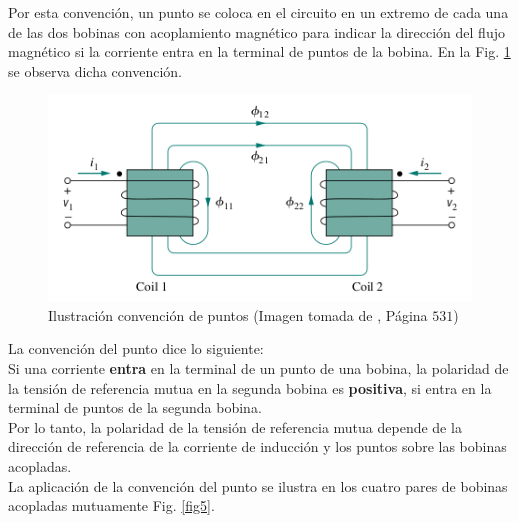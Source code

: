 \documentclass[twocolumn]{IEEEtran}
\begin{document}
Por esta convención, un punto se coloca en el circuito en un extremo de cada una de las dos bobinas con acoplamiento magnético para indicar la dirección del flujo magnético si la corriente entra en la terminal de puntos de la bobina. En la Fig. \ref{fig4} se observa dicha convención.
\begin{figure}[H]
	\centering
		\includegraphics[scale=0.6]{point.png}
	\caption{Ilustración convención de puntos (Imagen tomada de \cite{sadiku}, Página $531$)}
	\label{fig4}
\end{figure}
\noindent
La convención del punto dice lo siguiente:\\
Si una corriente \textbf{entra} en la terminal de un punto de una bobina, la polaridad de la tensión de referencia mutua en la segunda bobina es \textbf{positiva},  si  entra en la terminal de puntos de la segunda bobina.\\
Por lo tanto, la polaridad de la tensión de referencia mutua depende de la dirección de referencia de la corriente de inducción y los puntos sobre las bobinas acopladas.\\
La aplicación de la convención del punto se ilustra en los cuatro pares de bobinas acopladas mutuamente Fig. \ref{fig5}.
\end{document}
